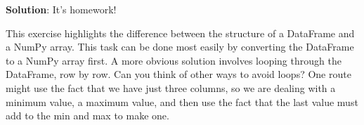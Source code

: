 \medskip

\noindent \textbf{Solution}: It's homework!

This exercise highlights the difference between the structure of a DataFrame and a NumPy array. This task can be done most easily by converting the DataFrame to a NumPy array first. A more obvious solution involves looping through the DataFrame, row by row. Can you think of other ways to avoid loops? One route might use the fact that we have just three columns, so we are dealing with a minimum value, a maximum value, and then use the fact that the last value must add to the min and max to make one. 



